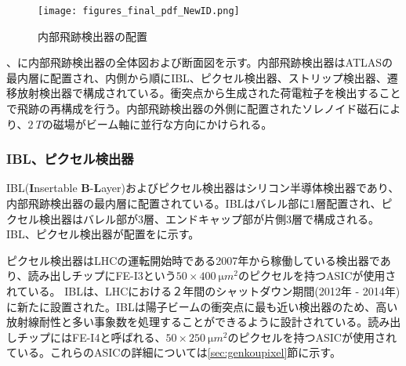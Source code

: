 \begin{figure}[tbp]
  \centering
  \texttt{[image: figures\_final\_pdf\_NewID.png]}
  \caption[内部飛跡検出器の配置]{内部飛跡検出器の配置 \cite{studyofID} }
  \label{fig:IDfigure}
\end{figure}


、に内部飛跡検出器の全体図および断面図を示す。内部飛跡検出器はATLASの最内層に配置され、内側から順にIBL、ピクセル検出器、ストリップ検出器、遷移放射検出器で構成されている。衝突点から生成された荷電粒子を検出することで飛跡の再構成を行う。内部飛跡検出器の外側に配置されたソレノイド磁石により、$2\ \si{T}$の磁場がビーム軸に並行な方向にかけられる。


\subsubsection{IBL、ピクセル検出器}
\label{sec:pixels}

IBL(\textbf{I}nsertable \textbf{B}-\textbf{L}ayer)およびピクセル検出器はシリコン半導体検出器であり、内部飛跡検出器の最内層に配置されている。IBLはバレル部に1層配置され、ピクセル検出器はバレル部が3層、エンドキャップ部が片側3層で構成される。IBL、ピクセル検出器が配置をに示す。

ピクセル検出器はLHCの運転開始時である2007年から稼働している検出器であり、読み出しチップにFE-I3という$50\times400\ \si{\micro m^2}$のピクセルを持つASICが使用されている。
IBLは、LHCにおける２年間のシャットダウン期間(2012年 - 2014年)に新たに設置された。IBLは陽子ビームの衝突点に最も近い検出器のため、高い放射線耐性と多い事象数を処理することができるように設計されている。読み出しチップにはFE-I4と呼ばれる、$50\times250\ \si{\micro m^2}$のピクセルを持つASICが使用されている。これらのASICの詳細については\ref{sec:genkoupixel}節に示す。

